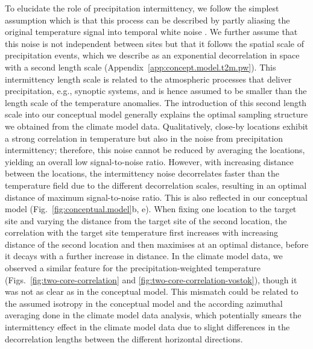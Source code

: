 \documentclass[cp, manuscript]{copernicus}
\begin{document}
To elucidate the role of precipitation intermittency, we follow the simplest
assumption which is that this process can be described by partly aliasing the
original temperature signal into temporal white noise
\citep{Laepple2018,Casado2020}. We further assume that this noise is not
independent between sites but that it follows the spatial scale of precipitation
events, which we describe as an exponential decorrelation in space with a second
length scale (Appendix~\ref{app:concept.model.t2m.pw}). This intermittency
length scale is related to the atmospheric processes that deliver precipitation,
e.g., synoptic systems, and is hence assumed to be smaller than the length scale
of the temperature anomalies. The introduction of this second length scale into
our conceptual model generally explains the optimal sampling structure we
obtained from the climate model data. Qualitatively, close-by locations exhibit
a strong correlation in temperature but also in the noise from precipitation
intermittency; therefore, this noise cannot be reduced by averaging the
locations, yielding an overall low signal-to-noise ratio. However, with
increasing distance between the locations, the intermittency noise decorrelates
faster than the temperature field due to the different decorrelation scales,
resulting in an optimal distance of maximum signal-to-noise ratio. This is also
reflected in our conceptual model (Fig.~\ref{fig:conceptual.model}b, e). When
fixing one location to the target site and varying the distance from the target
site of the second location, the correlation with the target site temperature
first increases with increasing distance of the second location and then
maximises at an optimal distance, before it decays with a further increase in
distance. In the climate model data, we observed a similar feature for the
precipitation-weighted temperature (Figs.~\ref{fig:two-core-correlation} and
\ref{fig:two-core-correlation-vostok}), though it was not as clear as in the
conceptual model. This mismatch could be related to the assumed isotropy in the
conceptual model and the according azimuthal averaging done in the climate model
data analysis, which potentially smears the intermittency effect in the climate
model data due to slight differences in the decorrelation lengths between the
different horizontal directions.
\end{document}
